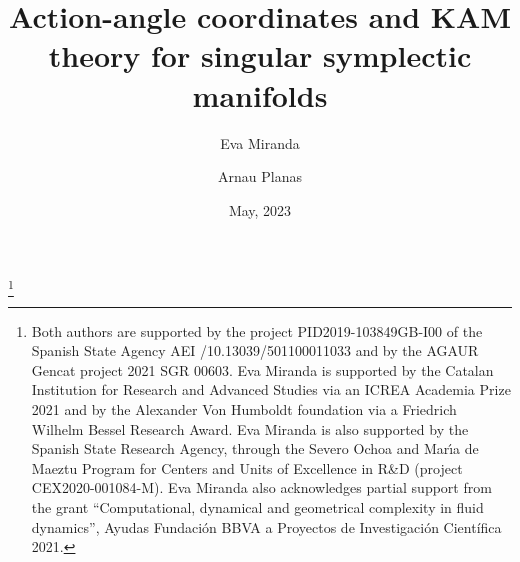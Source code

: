 \documentclass{amsbook}
\theoremstyle{definition}
\theoremstyle{remark}
\numberwithin{section}{chapter}
\numberwithin{equation}{chapter}
\begin{document}
\frontmatter
\title{Action-angle coordinates and KAM theory for singular symplectic manifolds}

\author{Eva Miranda}
\address{Laboratory of Geometry and Dynamical Systems, Department of Mathematics \& IMTech, Universitat Polit\`ecnica de Catalunya, Barcelona and CRM, Centre de Recerca Matemàtica, Bellaterra}

\thanks{ Both authors are supported by the project PID2019-103849GB-I00 of the Spanish State Agency  AEI /10.13039/501100011033 and by the AGAUR Gencat project 2021 SGR 00603. Eva Miranda is supported by the Catalan Institution for Research and Advanced Studies via an ICREA Academia Prize 2021 and by the Alexander Von Humboldt foundation via a Friedrich Wilhelm Bessel Research Award.  Eva Miranda is also supported by the Spanish State
Research Agency, through the Severo Ochoa and Mar\'{\i}a de Maeztu Program for Centers and Units
of Excellence in R\&D (project CEX2020-001084-M). Eva Miranda also acknowledges partial support from the grant
“Computational, dynamical and geometrical complexity in fluid dynamics”, Ayudas Fundación BBVA a Proyectos de Investigación Científica 2021.  }

\author{Arnau Planas}
\address{Department of Mathematics, Universitat Polit\`ecnica de Catalunya, Barcelona}

\date{May, 2023}

\maketitle
{}
\setcounter{page}{4}
\tableofcontents


\mainmatter


%
%


%
\backmatter






%
%
\end{document}
